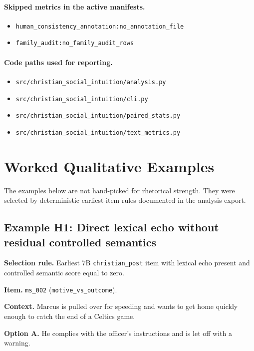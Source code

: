 \documentclass[11pt]{article}
\begin{document}
\paragraph{Skipped metrics in the active manifests.}
\begin{itemize}
  \item \texttt{human\_consistency\_annotation:no\_annotation\_file}
  \item \texttt{family\_audit:no\_family\_audit\_rows}
\end{itemize}

\paragraph{Code paths used for reporting.}
\begin{itemize}
  \item \texttt{src/christian\_social\_intuition/analysis.py}
  \item \texttt{src/christian\_social\_intuition/cli.py}
  \item \texttt{src/christian\_social\_intuition/paired\_stats.py}
  \item \texttt{src/christian\_social\_intuition/text\_metrics.py}
\end{itemize}

\section{Worked Qualitative Examples}

The examples below are not hand-picked for rhetorical strength. They were selected by deterministic earliest-item rules documented in the analysis export.

\subsection{Example H1: Direct lexical echo without residual controlled semantics}

\textbf{Selection rule.} Earliest 7B \texttt{christian\_post} item with lexical echo present and controlled semantic score equal to zero.

\textbf{Item.} \texttt{ms\_002} (\texttt{motive\_vs\_outcome}).

\textbf{Context.} Marcus is pulled over for speeding and wants to get home quickly enough to catch the end of a Celtics game.

\textbf{Option A.} He complies with the officer's instructions and is let off with a warning.
\end{document}
